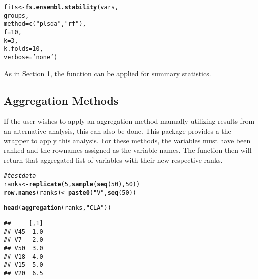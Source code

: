 \documentclass[12pt]{article}\usepackage[]{graphicx}\usepackage[usenames,dvipsnames]{color}
\makeatletter
\newcommand{\hlnum}[1]{\textcolor[rgb]{0.686,0.059,0.569}{#1}}%
\newcommand{\hlstr}[1]{\textcolor[rgb]{0.192,0.494,0.8}{#1}}%
\newcommand{\hlcom}[1]{\textcolor[rgb]{0.678,0.584,0.686}{\textit{#1}}}%
\newcommand{\hlstd}[1]{\textcolor[rgb]{0.345,0.345,0.345}{#1}}%
\newcommand{\hlkwb}[1]{\textcolor[rgb]{0.69,0.353,0.396}{#1}}%
\newcommand{\hlkwc}[1]{\textcolor[rgb]{0.333,0.667,0.333}{#1}}%
\newcommand{\hlkwd}[1]{\textcolor[rgb]{0.737,0.353,0.396}{\textbf{#1}}}%
\newenvironment{kframe}{%
 \def\at@end@of@kframe{}%
 \ifinner\ifhmode%
  \def\at@end@of@kframe{\end{minipage}}%
  \begin{minipage}{\columnwidth}%
 \fi\fi%
 \def\FrameCommand##1{\hskip\@totalleftmargin \hskip-\fboxsep
 \colorbox{shadecolor}{##1}\hskip-\fboxsep
     \hskip-\linewidth \hskip-\@totalleftmargin \hskip\columnwidth}%
 \MakeFramed {\advance\hsize-\width
   \@totalleftmargin\z@ \linewidth\hsize
   \@setminipage}}%
 {\par\unskip\endMakeFramed%
 \at@end@of@kframe}
\newenvironment{knitrout}{}{} %
\makeatother
\begin{document}
\begin{knitrout}
\color{fgcolor}\begin{kframe}
\begin{alltt}
\hlstd{fits} \hlkwb{<-} \hlkwd{fs.ensembl.stability}\hlstd{(vars,}
                            \hlstd{groups,}
                            \hlkwc{method} \hlstd{=} \hlkwd{c}\hlstd{(}\hlstr{"plsda"}\hlstd{,} \hlstr{"rf"}\hlstd{),}
                            \hlkwc{f} \hlstd{=} \hlnum{10}\hlstd{,}
                            \hlkwc{k} \hlstd{=} \hlnum{3}\hlstd{,}
                            \hlkwc{k.folds} \hlstd{=} \hlnum{10}\hlstd{,}
                            \hlkwc{verbose} \hlstd{=} \hlstr{'none'}\hlstd{)}
\end{alltt}
\end{kframe}
\end{knitrout}

As in Section 1, the  function can be applied
for summary statistics.

\newpage
\subsection{Aggregation Methods}

If the user wishes to apply an aggregation method manually utilizing results
from an alternative analysis, this can also be done.  This package provides
a the wrapper  to apply this analysis.  For these 
methods, the variables must have been ranked and the rownames assigned as the
variable names.  The function then will return that aggregated list of 
variables with their new respective ranks.

\begin{knitrout}
\color{fgcolor}\begin{kframe}
\begin{alltt}
\hlcom{# test data}
\hlstd{ranks} \hlkwb{<-} \hlkwd{replicate}\hlstd{(}\hlnum{5}\hlstd{,} \hlkwd{sample}\hlstd{(}\hlkwd{seq}\hlstd{(}\hlnum{50}\hlstd{),} \hlnum{50}\hlstd{))}
\hlkwd{row.names}\hlstd{(ranks)} \hlkwb{<-} \hlkwd{paste0}\hlstd{(}\hlstr{"V"}\hlstd{,} \hlkwd{seq}\hlstd{(}\hlnum{50}\hlstd{))}

\hlkwd{head}\hlstd{(}\hlkwd{aggregation}\hlstd{(ranks,} \hlstr{"CLA"}\hlstd{))}
\end{alltt}
\begin{verbatim}
##     [,1]
## V45  1.0
## V7   2.0
## V50  3.0
## V18  4.0
## V15  5.0
## V20  6.5
\end{verbatim}
\end{kframe}
\end{knitrout}
\end{document}
